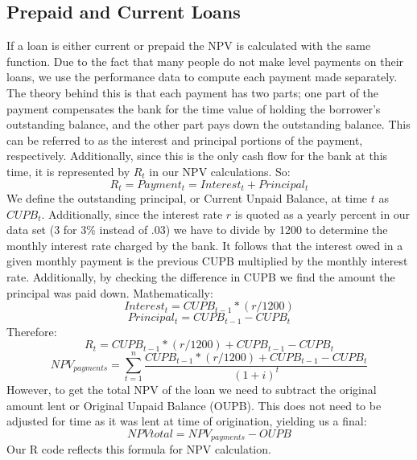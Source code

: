 \documentclass[12 pt]{uncw_thesis}
\theoremstyle{plain}
\theoremstyle{remark}
\theoremstyle{definition}
\begin{document}
\subsection{Prepaid and Current Loans}
If a loan is either current or prepaid the NPV is calculated with the same function. Due to the fact that many people do not make level payments on their loans, we use the performance data to compute each payment made separately. The theory behind this is that each payment has two parts; one part of the payment compensates the bank for the time value of holding the borrower's outstanding balance, and the other part pays down the outstanding balance. This can be referred to as the interest and principal portions of the payment, respectively. Additionally, since this is the only cash flow for the bank at this time, it is represented by \(R_t\) in our NPV calculations.  So:
\[R_t = Payment_t = Interest_t + Principal_t\]
We define the outstanding principal, or Current Unpaid Balance, at time \(t\) as \(CUPB_t\). Additionally, since the interest rate \(r\) is quoted as a yearly percent in our data set (3 for 3\% instead of .03) we have to divide by 1200 to determine the monthly interest rate charged by the bank. It follows that the interest owed in a given monthly payment is the previous CUPB multiplied by the monthly interest rate. Additionally, by checking the difference in CUPB we find the amount the principal was paid down. Mathematically:
\[Interest_t = CUPB_{t-1}*(r/1200)\]
\[Principal_t = CUPB_{t-1} - CUPB_{t}\]
Therefore: 
\[R_t = CUPB_{t-1}*(r/1200) + CUPB_{t-1} - CUPB_{t}\]
\[NPV_{payments} = \sum_{t=1}^n \frac{CUPB_{t-1}*(r/1200) + CUPB_{t-1} - CUPB_{t}}{(1+i)^t}\]
However, to get the total NPV of the loan we need to subtract the original amount lent or Original Unpaid Balance (OUPB). This does not need to be adjusted for time as it was lent at time of origination, yielding us a final:
\[NPV{total} = NPV_{payments} - OUPB\]
Our R code reflects this formula for NPV calculation.
\end{document}
